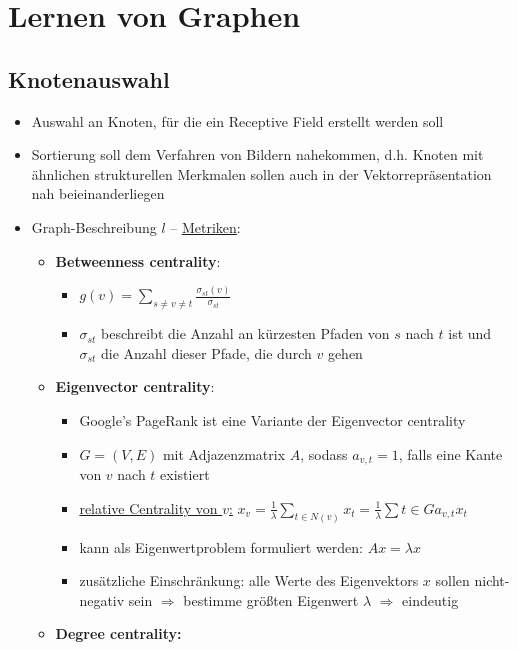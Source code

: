 \section{Lernen von Graphen}

\subsection{Knotenauswahl}

\begin{itemize}
  \item Auswahl an Knoten, für die ein Receptive Field erstellt werden soll
  \item Sortierung soll dem Verfahren von Bildern nahekommen, d.h. Knoten mit ähnlichen strukturellen Merkmalen sollen auch in der Vektorrepräsentation nah beieinanderliegen
  \item Graph-Beschreibung $l$ – \underline{Metriken}:
  \begin{itemize}
    \item \textbf{Betweenness centrality}:
      \begin{itemize}
        \item $g(v) = \sum_{s \neq v \neq t} \frac{\sigma_{st}(v)}{\sigma_{st}}$
        \item $\sigma_{st}$ beschreibt die Anzahl an kürzesten Pfaden von $s$ nach $t$ ist und $\sigma_{st}$ die Anzahl dieser Pfade, die durch $v$ gehen
      \end{itemize}
    \item \textbf{Eigenvector centrality}:
    \begin{itemize}
      \item Google's PageRank ist eine Variante der Eigenvector centrality
      \item $G=(V,E)$ mit Adjazenzmatrix $A$, sodass $a_{v,t} = 1$, falls eine Kante von $v$ nach $t$ existiert
      \item \underline{relative Centrality von $v$:} $x_v = \frac{1}{\lambda} \sum_{t \in N(v)} x_t = \frac{1}{\lambda} \sum{t \in G} a_{v,t}x_t$
      \item kann als Eigenwertproblem formuliert werden: $Ax = \lambda x$
      \item zusätzliche Einschränkung: alle Werte des Eigenvektors $x$ sollen nicht-negativ sein $\Rightarrow$ bestimme größten Eigenwert $\lambda$ $\Rightarrow$ eindeutig
    \end{itemize}
    \item \textbf{Degree centrality:}
    \begin{itemize}

\end{itemize}
\end{itemize}
\end{itemize}
